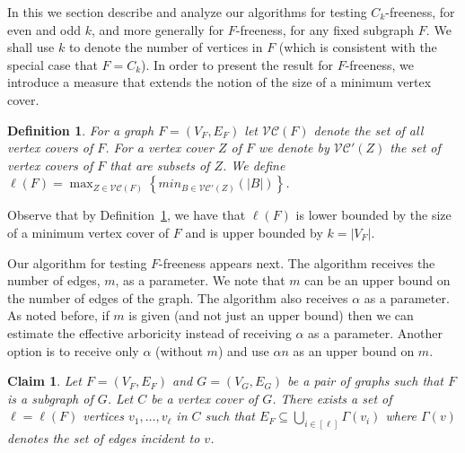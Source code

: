 \documentclass{article}
\newcommand{\calC}{{\mathcal{C}}}
\newtheorem{claim}[lemma]{Claim}
\newtheorem{definition}{Definition}
\newcommand{\commentt}[1]{ {}}
\begin{document}

\newcommand{\VC}{\mathcal{VC}}

In this we section describe and analyze our algorithms for testing
$C_k$-freeness, for even and odd $k$, and more generally for $F$-freeness, for any fixed subgraph $F$. 
We shall use $k$ to denote the number of vertices in $F$ (which is consistent with the special case that $F=C_k$).
In order to present the result for $F$-freeness, we introduce a measure that extends the notion of the size of a minimum vertex cover.

\begin{definition}\label{def:ell}
    For a graph $F = (V_F, E_F)$ let $\VC(F)$ denote the set of all vertex covers of $F$. For a vertex cover $Z$ of $F$ we denote by $\VC'(Z)$ the set of vertex covers of $F$ that are subsets of $Z$.
    We define $\ell(F) = \max_{Z \in \VC(F)} \left\{min_{B \in \VC'(Z)} \left(|B|\right)\right\}$.
\end{definition}
Observe that by Definition~\ref{def:ell}, we have that $\ell(F)$ is lower bounded by the size of a minimum vertex cover of $F$ and is upper bounded by $k = |V_F|$.

Our algorithm for testing $F$-freeness appears next. The algorithm receives the number of edges, $m$, as a parameter. We note that $m$ can be an upper bound on the number of edges of the graph. The algorithm also receives $\alpha$ as a parameter. As noted before, if $m$ is given (and not just an upper bound) then we can estimate the effective arboricity instead of receiving $\alpha$ as a parameter. Another option is to receive only $\alpha$ (without $m$) and use $\alpha n$ as an upper bound on $m$.   

\iffalse
\begin{claim}
Let $F = (V_F, E_F)$ and $G = (V_G, E_G)$ be a pair of graphs such that $F$ is a subgraph of $G$.
Let $C$ be a vertex cover of $G$.
There exists a set of $\ell = \ell(F)$ vertices $v_1, \ldots, v_\ell$ in $C$ such that $E_F \subseteq \bigcup_{i\in [\ell]} \Gamma(v_i)$ where $\Gamma(v)$ denotes the set of edges incident to $v$.
\commentt{maybe use $E(v)$ because $\Gamma(v)$ is usually used for the neighbors of $v$}
\end{claim}
\end{document}

